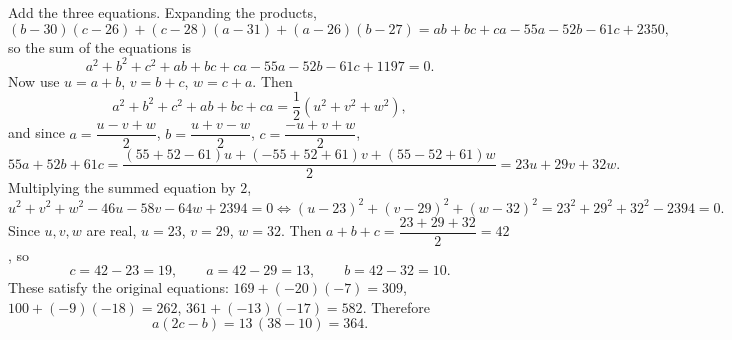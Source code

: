 Add the three equations. Expanding the products,
\[(b-30)(c-26)+(c-28)(a-31)+(a-26)(b-27)=ab+bc+ca-55a-52b-61c+2350,\]
so the sum of the equations is
\[a^2+b^2+c^2+ab+bc+ca-55a-52b-61c+1197=0 .\]
Now use $u=a+b$, $v=b+c$, $w=c+a$. Then
\[a^2+b^2+c^2+ab+bc+ca=\dfrac{1}{2}\left(u^2+v^2+w^2\right),\]
and since $a=\dfrac{u-v+w}{2}$, $b=\dfrac{u+v-w}{2}$, $c=\dfrac{-u+v+w}{2}$,
\[55a+52b+61c=\dfrac{(55+52-61)u+(-55+52+61)v+(55-52+61)w}{2}=23u+29v+32w .\]
Multiplying the summed equation by $2$,
\[u^2+v^2+w^2-46u-58v-64w+2394=0\iff(u-23)^2+(v-29)^2+(w-32)^2=23^2+29^2+32^2-2394=0 .\]
Since $u,v,w$ are real, $u=23$, $v=29$, $w=32$. Then $a+b+c=\dfrac{23+29+32}{2}=42$, so
\[c=42-23=19,\qquad a=42-29=13,\qquad b=42-32=10 .\]
These satisfy the original equations: $169+(-20)(-7)=309$, $100+(-9)(-18)=262$, $361+(-13)(-17)=582$. Therefore
\[a(2c-b)=13\,(38-10)=\boxed{364}.\]
